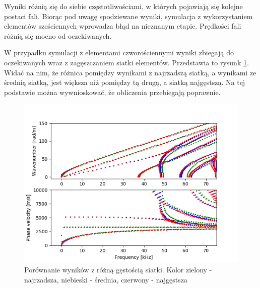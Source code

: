 Wyniki różnią się do siebie częstotliwościami, w których pojawiają się kolejne postaci fali. Biorąc pod uwagę spodziewane wyniki, symulacja z wykorzystaniem elementów sześciennych wprowadza błąd na nieznanym etapie. Prędkości fali różnią się mocno od oczekiwanych.

W przypadku symulacji z elementami czworościennymi wyniki zbiegają do oczekiwanych wraz z zagęszczaniem siatki elementów. Przedstawia to rysunk \ref{fig:porownanie}. Widać na nim, że różnica pomiędzy wynikami z najrzadszą siatką, a wynikami ze średnią siatką, jest większa niż pomiędzy tą drugą, a siatką najgęstszą.  Na tej podstawie można wywnioskować, że obliczenia przebiegają poprawnie.

\begin{figure}[h]
\centering
\includegraphics[width=14cm]{Zdjecia/5/porownanie}
\caption{Porównanie wyników z różną gęstością siatki. Kolor zielony - najrzadsza, niebieski - średnia, czerwony - najgęstsza}
\label{fig:porownanie}
\end{figure}